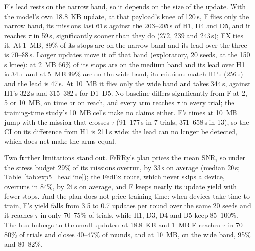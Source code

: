 F's lead rests on the narrow band, so it depends on the size of the update. With
the model's own 18.8~KB update, at that payload's knee of 120\,s, F flies only
the narrow band, its missions last 61\,s against the 203--205\,s of H1, D4 and
D5, and it reaches $\tau$ in 59\,s, significantly sooner than they do (272, 239
and 243\,s); FX ties it. At 1~MB, 89\% of its stops are on the narrow band and
its lead over the three is 70--88\,s. Larger updates move it off that band
(exploratory, 20 seeds, at the 150\,s knee): at 2~MB 66\% of its stops are on the
medium band and its lead over H1 is 34\,s, and at 5~MB 99\% are on the wide band,
its missions match H1's (256\,s) and the lead is 47\,s. At 10~MB it flies only
the wide band and takes 344\,s, against H1's 322\,s and 315--382\,s for D1--D5.
No baseline differs significantly from F at 2, 5 or 10~MB, on time or on reach,
and every arm reaches $\tau$ in every trial; the training-time study's 10~MB
cells make no claims either. F's times at 10~MB jump with the mission that
crosses $\tau$ (91--177\,s in 7 trials, 371--658\,s in 13), so the CI on its
difference from H1 is 211\,s wide: the lead can no longer be detected, which does
not make the arms equal.

Two further limitations stand out. FeRRy's plan prices the mean SNR, so
under the stress budget 29\% of its missions overrun, by 33\,s on average
(median 20\,s; Table~\ref{tab:exp5_headline}); the FedEx route, which never skips
a device, overruns in 84\%, by 24\,s on average, and F keeps nearly its update
yield with fewer stops. And the
plan does not price training time: when devices take time to train, F's yield
falls from 3.5 to 0.7 updates per round over the same 20 seeds and it reaches $\tau$ in only 70--75\% of
trials, while H1, D3, D4 and D5 keep 85--100\%. The loss belongs to the small
updates: at 18.8~KB and 1~MB F reaches $\tau$ in 70--80\% of trials and closes
40--47\% of rounds, and at 10~MB, on the wide band, 95\% and 80--82\%.

